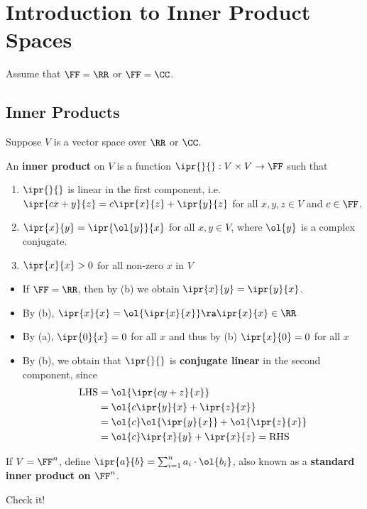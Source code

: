 \documentclass[11pt]{scrartcl}
\begin{document}
\section{Introduction to Inner Product Spaces}
Assume that $\FF = \RR$ or $\FF = \CC$.
\subsection{Inner Products}
\begin{definition}
  Suppose $V$ is a vector space over $\RR$ or $\CC$.

  An \textbf{inner product} on $V$ is a function
  $\ipr{\*}{\*}: V\times V\to \FF$ such that
  \begin{enumerate}[label=\alph*)]
  \item $\ipr{\*}{\*}$ is linear in the first component, i.e.
    $\ipr{cx+y}{ z} = c \ipr{x}{ z} + \ipr{y}{ z}$ for all
    $x, y, z \in V$ and $c\in \FF$.
  \item $\ipr{x}{ y} = \ipr{\ol{y}}{ x}$ for all $x, y \in V$, where
    $\ol{y}$ is a complex conjugate.
  \item $\ipr{x}{ x} > 0$ for all non-zero $x$ in $V$
\end{enumerate}
\end{definition}
\begin{remark}
\begin{itemize}
\item If $\FF = \RR$, then by (b) we obtain $\ipr{x}{ y} = \ipr{y}{ x}$.
\item By (b), $\ipr{x}{ x} = \ol{\ipr{x}{x}} \ra \ipr{x}{ x}\in \RR$
\item By (a), $\ipr{0}{x} = 0$ for all $x$ and thus by (b) $\ipr{x}{0} = 0$ for all $x$
\item By (b), we obtain that $\ipr{\*}{ \*}$ is \textbf{conjugate linear} in the second component, since
  \begin{align}
    \text{LHS} & = \ol{\ipr{cy+z}{ x}}             \\
               & = \ol{c \ipr{y}{ x} + \ipr{z}{ x}} \\
               & = \ol{c}\*\ol{\ipr{y}{ x}} + \ol{\ipr{z}{ x}}\\
               & = \ol{c} \ipr{x}{ y} + \ipr{x}{ z} = \text{RHS}
  \end{align}
\end{itemize}

\begin{example}

  If $V = \FF^{n}$, define
  $\ipr{a}{b} = \sum_{i=1}^na_{i}\cdot \ol{b_{i}}$, also known as a
  \textbf{standard inner product on $\FF^{n}$}.

  Check it!
\end{example}
\end{remark}
\end{document}
